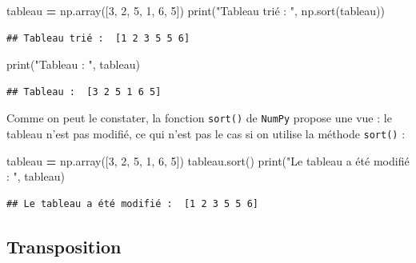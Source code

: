 \documentclass[
  12pt,
]{book}
\newenvironment{Shaded}{\begin{snugshade}}{\end{snugshade}}
\newcommand{\BuiltInTok}[1]{#1}
\newcommand{\DecValTok}[1]{\textcolor[rgb]{0.00,0.00,0.81}{#1}}
\newcommand{\NormalTok}[1]{#1}
\newcommand{\OperatorTok}[1]{\textcolor[rgb]{0.81,0.36,0.00}{\textbf{#1}}}
\newcommand{\StringTok}[1]{\textcolor[rgb]{0.31,0.60,0.02}{#1}}
\numberwithin{equation}{section}
\numberwithin{countremarque}{section}
\begin{document}
\begin{Shaded}
\begin{Highlighting}[]
\NormalTok{tableau }\OperatorTok{=}\NormalTok{ np.array([}\DecValTok{3}\NormalTok{, }\DecValTok{2}\NormalTok{, }\DecValTok{5}\NormalTok{, }\DecValTok{1}\NormalTok{, }\DecValTok{6}\NormalTok{, }\DecValTok{5}\NormalTok{])}
\BuiltInTok{print}\NormalTok{(}\StringTok{"Tableau trié : "}\NormalTok{, np.sort(tableau))}
\end{Highlighting}
\end{Shaded}

\begin{lstlisting}
## Tableau trié :  [1 2 3 5 5 6]
\end{lstlisting}

\begin{Shaded}
\begin{Highlighting}[]
\BuiltInTok{print}\NormalTok{(}\StringTok{"Tableau : "}\NormalTok{, tableau)}
\end{Highlighting}
\end{Shaded}

\begin{lstlisting}
## Tableau :  [3 2 5 1 6 5]
\end{lstlisting}

Comme on peut le constater, la fonction \texttt{sort()} de \texttt{NumPy} propose une vue : le tableau n'est pas modifié, ce qui n'est pas le cas si on utilise la méthode \texttt{sort()} :

\begin{Shaded}
\begin{Highlighting}[]
\NormalTok{tableau }\OperatorTok{=}\NormalTok{ np.array([}\DecValTok{3}\NormalTok{, }\DecValTok{2}\NormalTok{, }\DecValTok{5}\NormalTok{, }\DecValTok{1}\NormalTok{, }\DecValTok{6}\NormalTok{, }\DecValTok{5}\NormalTok{])}
\NormalTok{tableau.sort()}
\BuiltInTok{print}\NormalTok{(}\StringTok{"Le tableau a été modifié : "}\NormalTok{, tableau)}
\end{Highlighting}
\end{Shaded}

\begin{lstlisting}
## Le tableau a été modifié :  [1 2 3 5 5 6]
\end{lstlisting}

\subsection{Transposition}\label{transposition-tableau}
\end{document}
